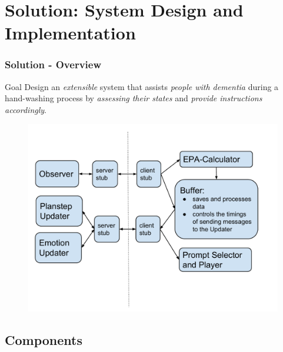 \documentclass{beamer}
\begin{document}
\section{Solution: System Design and Implementation}
\begin{frame}
\frametitle{Solution - Overview}
\begin{block}{Goal}
\small{
Design an \textit{extensible} system that assists \textit{people with dementia} during a hand-washing process by \textit{assessing their states} and \textit{provide instructions accordingly}.
}
\end{block}
\pause 
\begin{figure}
\centering
\includegraphics[trim = 5mm 15mm 5mm 20mm, clip, width=.8\linewidth]{fig/fig-system-overview.pdf}
\end{figure}
\end{frame}

\subsection{Components}
\end{document}
